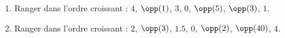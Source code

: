 
\begin{exercice}\label{exo2smath-0050}

    \begin{enumerate}
        \item
            Ranger dans l'ordre croissant : \( 4\), \( \opp(1)\), \( 3\), \( 0\), \( \opp(5)\), \( \opp(3)\), \( 1\).
        \item
            Ranger dans l'ordre croissant : \( 2\), \( \opp(3)\), \( 1.5\), \( 0\), \( \opp(2)\), \( \opp(40)\), \( 4\).
    \end{enumerate}

\end{exercice}
